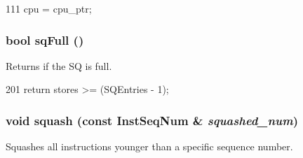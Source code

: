 \begin{DoxyCode}
111     { cpu = cpu_ptr; }
\end{DoxyCode}
\hypertarget{classOzoneLSQ_a477981d1f905d2d398a1527f7149e3c4}{
\subsubsection[{sqFull}]{\setlength{\rightskip}{0pt plus 5cm}bool sqFull ()}}
\label{classOzoneLSQ_a477981d1f905d2d398a1527f7149e3c4}
Returns if the SQ is full. 


\begin{DoxyCode}
201 { return stores >= (SQEntries - 1); }
\end{DoxyCode}
\hypertarget{classOzoneLSQ_a51dd7e304d5413447717826fac6f4921}{
\subsubsection[{squash}]{\setlength{\rightskip}{0pt plus 5cm}void squash (const {\bf InstSeqNum} \& {\em squashed\_\-num})}}
\label{classOzoneLSQ_a51dd7e304d5413447717826fac6f4921}
Squashes all instructions younger than a specific sequence number. 


